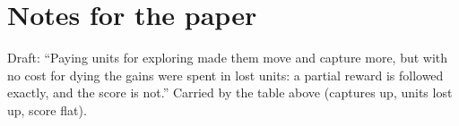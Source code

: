 \documentclass{../polyexp}
\begin{document}
\section{Notes for the paper}
Draft: ``Paying units for exploring made them move and capture more, but with no cost for dying the gains were
spent in lost units: a partial reward is followed exactly, and the score is not.'' Carried by the table above
(captures up, units lost up, score flat).
\end{document}
